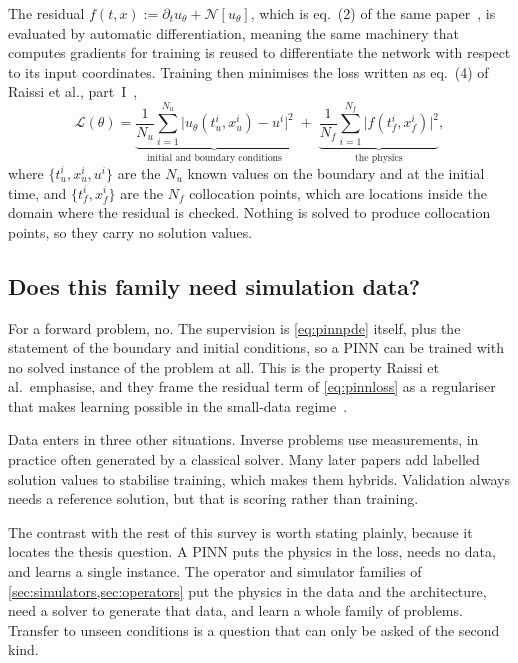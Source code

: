\documentclass[11pt, a4paper]{article}
\begin{document}
The residual $f(t, x) := \partial_t u_\theta + \mathcal{N}[u_\theta]$, which
is eq.~(2) of the same paper~\citep[part~I]{raissi1}, is evaluated by
automatic differentiation, meaning the same machinery that computes gradients
for training is reused to differentiate the network with respect to its input
coordinates. Training then minimises the loss written as eq.~(4) of Raissi
et al., part~I~\citep{raissi1},
%
\begin{equation}
  \mathcal{L}(\theta)
  = \underbrace{\frac{1}{N_u}\sum_{i=1}^{N_u}
      \bigl| u_\theta(t^i_u, x^i_u) - u^i \bigr|^2}_{\text{initial and
      boundary conditions}}
  \; + \;
  \underbrace{\frac{1}{N_f}\sum_{i=1}^{N_f}
      \bigl| f(t^i_f, x^i_f) \bigr|^2}_{\text{the physics}},
  \label{eq:pinnloss}
\end{equation}
%
where $\{t^i_u, x^i_u, u^i\}$ are the $N_u$ known values on the boundary and
at the initial time, and $\{t^i_f, x^i_f\}$ are the $N_f$ collocation points,
which are locations inside the domain where the residual is checked. Nothing
is solved to produce collocation points, so they carry no solution values.

\subsection{Does this family need simulation data?}

For a forward problem, no. The supervision is \cref{eq:pinnpde} itself, plus
the statement of the boundary and initial conditions, so a PINN can be
trained with no solved instance of the problem at all. This is the property
Raissi et al.\ emphasise, and they frame the residual term of
\cref{eq:pinnloss} as a regulariser that makes learning possible in the
small-data regime~\citep[\S{}1, \S{}2.1]{raissi1}.

Data enters in three other situations. Inverse problems use measurements, in
practice often generated by a classical solver. Many later papers add
labelled solution values to stabilise training, which makes them hybrids.
Validation always needs a reference solution, but that is scoring rather
than training.

The contrast with the rest of this survey is worth stating plainly, because
it locates the thesis question. A PINN puts the physics in the loss, needs
no data, and learns a single instance. The operator and simulator families
of \cref{sec:simulators,sec:operators} put the physics in the data and the
architecture, need a solver to generate that data, and learn a whole family
of problems. Transfer to unseen conditions is a question that can only be
asked of the second kind.
\end{document}
